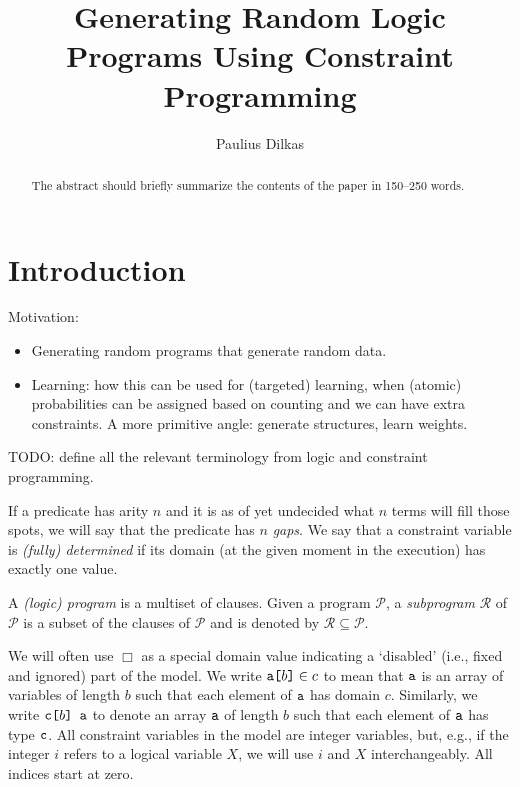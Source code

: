 \documentclass[runningheads]{llncs}
\newcommand{\variable}[1]{\texttt{\textup{#1}}}
\newcommand{\arrayd}[3]{\variable{{#1}[}{#2}\variable{]} \in {#3}}
\newcommand{\arrayt}[3]{\variable{{#3}[}{#2}\variable{] {#1}}}
\begin{document}
\title{Generating Random Logic Programs Using Constraint Programming}
\author{Paulius Dilkas}

\maketitle

\begin{abstract}
The abstract should briefly summarize the contents of the paper in
150--250 words.

\end{abstract}

\section{Introduction}

Motivation:
\begin{itemize}
\item Generating random programs that generate random data.
\item Learning: how this can be used for (targeted) learning, when (atomic)
  probabilities can be assigned based on counting and we can have extra
  constraints. A more primitive angle: generate structures, learn weights.
\end{itemize}

TODO: define all the relevant terminology from logic and constraint programming.

If a predicate has arity $n$ and it is as of yet undecided what $n$ terms will
fill those spots, we will say that the predicate has $n$ \emph{gaps}. We say
that a constraint variable is \emph{(fully) determined} if its domain (at the
given moment in the execution) has exactly one value.

A \emph{(logic) program} is a multiset of clauses. Given a program
$\mathscr{P}$, a \emph{subprogram} $\mathscr{R}$ of $\mathscr{P}$ is a subset of
the clauses of $\mathscr{P}$ and is denoted by $\mathscr{R} \subseteq
\mathscr{P}$.

We will often use $\Box$ as a special domain value indicating a `disabled'
(i.e., fixed and ignored) part of the model. We write $\arrayd{a}{b}{c}$ to mean
that $\variable{a}$ is an array of variables of length $b$ such that each
element of $\variable{a}$ has domain $c$. Similarly, we write $\arrayt{a}{b}{c}$
to denote an array $\variable{a}$ of length $b$ such that each element of
$\variable{a}$ has type $\variable{c}$. All constraint variables in the model
are integer variables, but, e.g., if the integer $i$ refers to a logical
variable $X$, we will use $i$ and $X$ interchangeably. All indices start at
zero.
\end{document}
